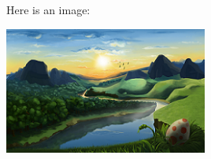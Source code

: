 \documentclass{article}
\begin{document}
Here is an image:

\includegraphics[width=0.5\textwidth]{example-image}
\end{document}
